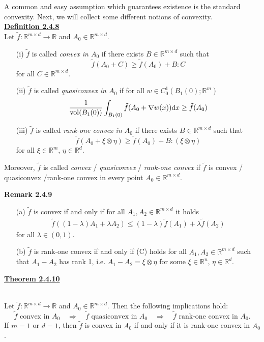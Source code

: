 A common and easy assumption which guarantees existence is the standard convexity. Next, we will collect some different notions of convexity.\\[11pt]

\hypertarget{definition_2_4_8}{\textbf{\underline{Definition 2.4.8}}}\\
Let $\tilde{f}:\mathbb{R}^{m\times d}\longrightarrow\mathbb{R}$ and $A_0\in\mathbb{R}^{m\times d}$.
\begin{itemize}
	\item[(i)] $\tilde{f}$ is called \textit{convex in $A_0$} if there exists $B\in\mathbb{R}^{m\times d}$ such that
	\[\tilde{f}(A_0+C)\geq\tilde{f}(A_0)+B:C\]
	for all $C\in\mathbb{R}^{m\times d}$.
	\item[(ii)] $\tilde{f}$ is called \textit{quasiconvex in $A_0$} if for all $w\in C_0^1(B_1(0);\mathbb{R}^m)$
	\[\frac{1}{\operatorname{vol}\mathopen{}\left(B_1(0)\right)\mathclose{}}\int_{B_1(0)}{\tilde{f}(A_0+\nabla w(x))\mathrm{d}x}\geq\tilde{f}(A_0)\]
	\item[(iii)] $\tilde{f}$ is called \textit{rank-one convex in $A_0$} if there exists $B\in\mathbb{R}^{m\times d}$ such that
	\[\tilde{f}(A_0+\xi\otimes\eta)\geq\tilde{f}(A_0)+B:(\xi\otimes\eta)\]
	for all $\xi\in\mathbb{R}^m$, $\eta\in\mathbb{R}^d$.
\end{itemize}
Moreover, $\tilde{f}$ is called \textit{convex} / \textit{quasiconvex} / \textit{rank-one convex} if $\tilde{f}$ is convex / quasiconvex /rank-one convex in every point $A_0\in\mathbb{R}^{m\times d}$.\newpage

\textbf{Remark 2.4.9}
\begin{itemize}
	\item[(a)] $\tilde{f}$ is convex if and only if for all $A_1,A_2\in\mathbb{R}^{m\times d}$ it holds
	\begin{align}\label{eq:mcov_formula_c}
		\tilde{f}((1-\lambda)A_1+\lambda A_2)\leq(1-\lambda)\tilde{f}(A_1)+\lambda\tilde{f}(A_2)\tag{C}
	\end{align}
	for all $\lambda\in(0,1)$.
	\item[(b)] $\tilde{f}$ is rank-one convex if and only if (C) holds for all $A_1,A_2\in\mathbb{R}^{m\times d}$ such that $A_1-A_2$ has rank 1, i.e. $A_1-A_2=\xi\otimes\eta$ for some $\xi\in\mathbb{R}^n$, $\eta\in\mathbb{R}^d$.\\[11pt]
\end{itemize}

\hypertarget{theorem_2_4_10}{\textbf{\underline{Theorem 2.4.10}}}\\
Let $\tilde{f}:\mathbb{R}^{m\times d}\longrightarrow\mathbb{R}$ and $A_0\in\mathbb{R}^{m\times d}$. Then the following implications hold:
\[\tilde{f}\text{ convex in }A_0\quad\Rightarrow\quad\tilde{f}\text{ quasiconvex in }A_0\quad\Rightarrow\quad\tilde{f}\text{ rank-one convex in }A_0.\]
If $m=1$ or $d=1$, then $\tilde{f}$ is convex in $A_0$ if and only if it is rank-one convex in $A_0$.\\[11pt]

